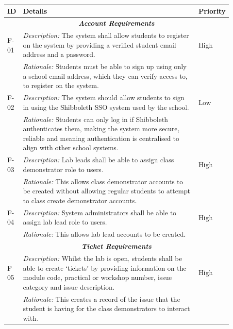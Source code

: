 \documentclass[a4paper,11pt]{article}
\begin{document}
\begin{table}[H]
\small
\begin{tabular}{|p{0.05\linewidth} | p{0.78\linewidth} |p{0.09\linewidth}|}
 \hline
 \textbf{ID} & \textbf{Details} & \textbf{Priority} \\
 \hline
 
 \multicolumn{3}{c}{\textit{\textbf{Account Requirements}}}\\
 
 \hline
 F-01 & \textit{Description:} The system shall allow students to register on the system by providing a verified student email address and a password. & High\\
  \cline{2-2}
  & \textit{Rationale:} Students must be able to sign up using only a school email address, which they can verify access to, to register on the system. & \\

  
   \hline\hline
 F-02 & \textit{Description:} The system should allow students to sign in using the Shibboleth SSO system used by the school. & Low\\
  \cline{2-2}
  & \textit{Rationale:} Students can only log in if Shibboleth authenticates them, making the system more secure, reliable and meaning authentication is centralised to align with other school systems. & \\

  
     \hline\hline
 F-03 & \textit{Description:} Lab leads shall be able to assign class demonstrator role to users. & High\\
  \cline{2-2}
  & \textit{Rationale:} This allows class demonstrator accounts to be created without allowing regular students to attempt to class create demonstrator accounts. & \\

  
       \hline\hline
 F-04 & \textit{Description:} System administrators shall be able to assign lab lead role to users. & High\\
  \cline{2-2}
  & \textit{Rationale:} This allows lab lead accounts to be created. & \\
  \hline
  
   \multicolumn{3}{c}{\textit{\textbf{Ticket Requirements}}}\\
  
 \hline
 F-05 & \textit{Description:} Whilst the lab is open, students shall be able to create `tickets' by providing information on the module code, practical or workshop number, issue category and issue description. & High\\
  \cline{2-2}
  & \textit{Rationale:} This creates a record of the issue that the student is having for the class demonstrators to interact with. & \\


\end{tabular}
\end{table}
\end{document}
